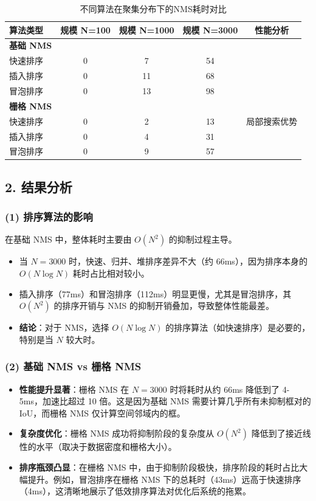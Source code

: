 \documentclass[a4paper,12pt]{ctexart}
\begin{document}
\begin{table}[H]
\centering
\caption{不同算法在聚集分布下的NMS耗时对比}
\label{tab:cluster_dist}
\begin{tabular}{@{}lcccc@{}}
\toprule
\textbf{算法类型} & \textbf{规模 N=100} & \textbf{规模 N=1000} & \textbf{规模 N=3000} & \textbf{性能分析} \\ \midrule
\textbf{基础 NMS} & & & & \\
快速排序 & 0 & 7 & 54 & \\
插入排序 & 0 & 11 & 68 & \\
冒泡排序 & 0 & 13 & 98 & \\ \midrule
\textbf{栅格 NMS} & & & & \\
快速排序 & 0 & 2 & 13 & 局部搜索优势 \\
插入排序 & 0 & 4 & 31 & \\
冒泡排序 & 0 & 9 & 57 & \\ \bottomrule
\end{tabular}
\end{table}

\subsection{2. 结果分析}

\subsubsection{(1) 排序算法的影响}
在基础 NMS 中，整体耗时主要由 $O(N^2)$ 的抑制过程主导。
\begin{itemize}
    \item 当 $N=3000$ 时，快速、归并、堆排序差异不大（约 66ms），因为排序本身的 $O(N \log N)$ 耗时占比相对较小。
    \item 插入排序（77ms）和冒泡排序（112ms）明显更慢，尤其是冒泡排序，其 $O(N^2)$ 的排序开销与 NMS 的抑制开销叠加，导致整体性能最差。
    \item \textbf{结论}：对于 NMS，选择 $O(N \log N)$ 的排序算法（如快速排序）是必要的，特别是当 $N$ 较大时。
\end{itemize}

\subsubsection{(2) 基础 NMS vs 栅格 NMS}
\begin{itemize}
    \item \textbf{性能提升显著}：栅格 NMS 在 $N=3000$ 时将耗时从约 66ms 降低到了 4-5ms，加速比超过 10 倍。这是因为基础 NMS 需要计算几乎所有未抑制框对的 IoU，而栅格 NMS 仅计算空间邻域内的框。
    \item \textbf{复杂度优化}：栅格 NMS 成功将抑制阶段的复杂度从 $O(N^2)$ 降低到了接近线性的水平（取决于数据密度和栅格大小）。
    \item \textbf{排序瓶颈凸显}：在栅格 NMS 中，由于抑制阶段极快，排序阶段的耗时占比大幅提升。例如，冒泡排序在栅格 NMS 下的总耗时（43ms）远高于快速排序（4ms），这清晰地展示了低效排序算法对优化后系统的拖累。
\end{itemize}
\end{document}
